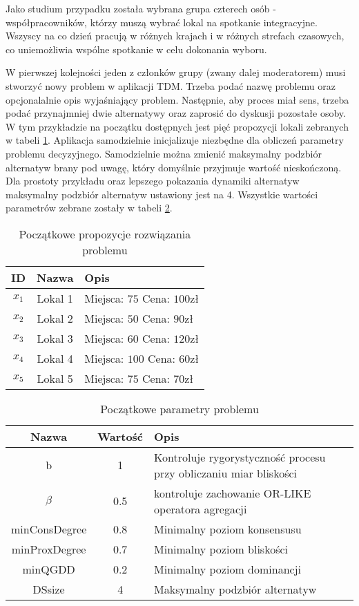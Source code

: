 Jako studium przypadku została wybrana grupa czterech osób - współpracowników,
którzy muszą wybrać lokal na spotkanie integracyjne. Wszyscy na co dzień
pracują w różnych krajach i w różnych strefach czasowych, co uniemożliwia
wspólne spotkanie w celu dokonania wyboru.

W pierwszej kolejności jeden z członków grupy (zwany dalej moderatorem) musi
stworzyć nowy problem w aplikacji TDM. Trzeba podać nazwę problemu oraz
opcjonalalnie opis wyjaśniający problem. Następnie, aby proces miał sens, trzeba
podać przynajmniej dwie alternatywy oraz zaprosić do dyskusji pozostałe osoby. W
tym przykładzie na początku dostępnych jest pięć propozycji lokali zebranych w
tabeli \ref{tab:init_ideas}.
Aplikacja samodzielnie inicjalizuje niezbędne dla obliczeń parametry problemu
decyzyjnego. Samodzielnie można zmienić maksymalny podzbiór alternatyw brany pod
uwagę, który domyślnie przyjmuje wartość nieskończoną. Dla prostoty przykładu
oraz lepszego pokazania dynamiki alternatyw maksymalny podzbiór alternatyw
ustawiony jest na 4. Wszystkie wartości parametrów zebrane zostały w tabeli
\ref{tab:init_problem_params}.

\begin{table}[ht]
\caption{Początkowe propozycje rozwiązania problemu}
\begin{tabularx}{\textwidth}{|c|c|X|}
\hline
ID & Nazwa & Opis \\
\hline
$x_1$ & Lokal 1 & Miejsca: $75$ Cena: $100\textrm{zł}$ \\
\hline
$x_2$ & Lokal 2 & Miejsca: $50$ Cena: $90\textrm{zł}$ \\
\hline
$x_3$ & Lokal 3 & Miejsca: $60$ Cena: $120\textrm{zł}$ \\
\hline
$x_4$ & Lokal 4 & Miejsca: $100$ Cena: $60\textrm{zł}$ \\
\hline
$x_5$ & Lokal 5 & Miejsca: $75$ Cena: $70\textrm{zł}$ \\
\hline
\end{tabularx}
\label{tab:init_ideas}
\end{table}

\begin{table}[ht]
\caption{Początkowe parametry problemu}
\begin{tabularx}{\textwidth}{|c|c|X|}
\hline
Nazwa & Wartość & Opis \\
\hline
b & 1 & Kontroluje rygorystyczność procesu przy obliczaniu miar bliskości \\
\hline
$\beta$ & 0.5 & kontroluje zachowanie OR-LIKE operatora agregacji \\
\hline
minConsDegree & 0.8 & Minimalny poziom konsensusu \\
\hline
minProxDegree & 0.7 & Minimalny poziom bliskości \\
\hline
minQGDD & 0.2 & Minimalny poziom dominancji \\
\hline
DSsize & 4 & Maksymalny podzbiór alternatyw \\
\hline
\end{tabularx}
\label{tab:init_problem_params}
\end{table}

